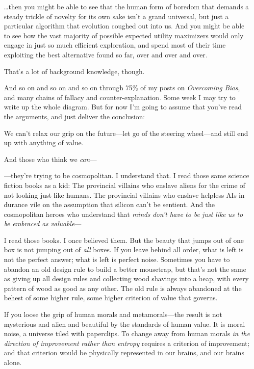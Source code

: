  \ldots then you might be able to see that the human form of boredom
that demands a steady trickle of novelty for its own sake
isn't a grand universal, but just a particular
algorithm that evolution coughed out into us. And you might be able to
see how the vast majority of possible expected utility maximizers would
only engage in just so much efficient exploration, and spend most of
their time exploiting the best alternative found so far, over and over
and over.


 That's a lot of background knowledge, though.


 And so on and so on and so on through 75\% of my posts on
\textit{Overcoming Bias}, and many chains of fallacy and
counter-explanation. Some week I may try to write up the whole diagram.
But for now I'm going to assume that
you've read the arguments, and just deliver the
conclusion:


 We can't relax our grip on the future---let go of
the steering wheel---and still end up with anything of value.


 And those who think we \textit{can}{}---

{
 {}---they're trying to be cosmopolitan. I
understand that. I read those same science fiction books as a kid: The
provincial villains who enslave aliens for the crime of not looking
just like humans. The provincial villains who enslave helpless AIs in
durance vile on the assumption that silicon can't be
sentient. And the cosmopolitan heroes who understand that \textit{minds
don't have to be just like us to be embraced as
valuable}{}---}


 I read those books. I once believed them. But the beauty that
jumps out of one box is not jumping out of \textit{all} boxes. If you
leave behind all order, what is left is not the perfect answer; what is
left is perfect noise. Sometimes you have to abandon an old design rule
to build a better mousetrap, but that's not the same as
giving up all design rules and collecting wood shavings into a heap,
with every pattern of wood as good as any other. The old rule is always
abandoned at the behest of some higher rule, some higher criterion of
value that governs.


 If you loose the grip of human morals and metamorals---the result
is not mysterious and alien and beautiful by the standards of human
value. It is moral noise, a universe tiled with paperclips. To change
away from human morals \textit{in the direction of improvement rather
than entropy} requires a criterion of improvement; and that criterion
would be physically represented in our brains, and our brains alone.


